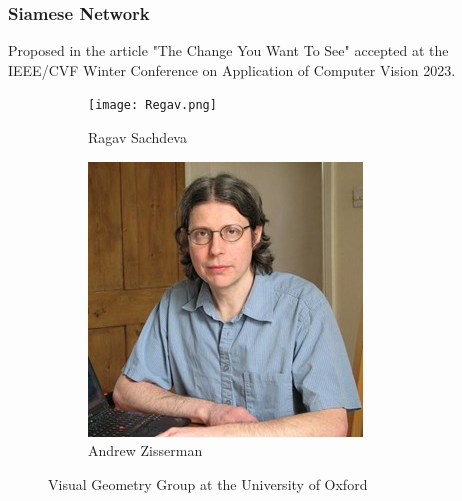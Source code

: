 \documentclass[13.5pt,aspecratio=169, xcolor=dvipsnames]{beamer}
\begin{document}

\begin{frame}
    \onehalfspacing
        \frametitle{Siamese Network}
        Proposed in the article "The Change You Want To See" accepted at the IEEE/CVF Winter Conference on Application of Computer Vision 2023.
        \bigskip
        \begin{figure}
            \begin{subfigure}{0.5\textwidth}
              \centering
              \texttt{[image: Regav.png]}
              \captionsetup{labelformat=empty}
              \caption{Ragav Sachdeva}
              \label{fig:subfig1}
            \end{subfigure}%
            \begin{subfigure}{0.5\textwidth}
              \centering
              \includegraphics[width=0.7\linewidth]{Zisserman.jpg}
              \captionsetup{labelformat=empty}
              \caption{Andrew Zisserman}
              \label{fig:subfig2}
            \end{subfigure}
            \captionsetup{labelformat=empty}
            \caption{Visual Geometry Group at the University of Oxford}
            \label{fig:overall}
        \end{figure}
      
\end{frame}
    
\end{document}
